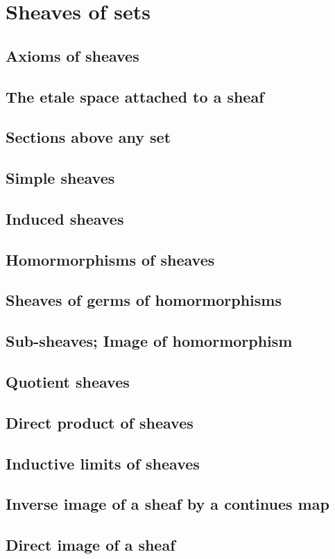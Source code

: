 \section{Sheaves of sets}
\label{section:II.1}

\subsection{Axioms of sheaves}
\label{subsection:II.1.1}

\subsection{The etale space attached to a sheaf}
\label{subsection:II.1.2}

\subsection{Sections above any set}
\label{subsection:II.1.3}

\subsection{Simple sheaves}
\label{subsection:II.1.4}

\subsection{Induced sheaves}
\label{subsection:II.1.5}

\subsection{Homormorphisms of sheaves}
\label{subsection:II.1.6}

\subsection{Sheaves of germs of homormorphisms}
\label{subsection:II.1.7}

\subsection{Sub-sheaves; Image of homormorphism}
\label{subsection:II.1.8}

\subsection{Quotient sheaves}
\label{subsection:II.1.9}

\subsection{Direct product of sheaves}
\label{subsection:II.1.10}

\subsection{Inductive limits of sheaves}
\label{subsection:II.1.11}

\subsection{Inverse image of a sheaf by a continues map}
\label{subsection:II.1.12}

\subsection{Direct image of a sheaf}
\label{subsection:II.1.13}
